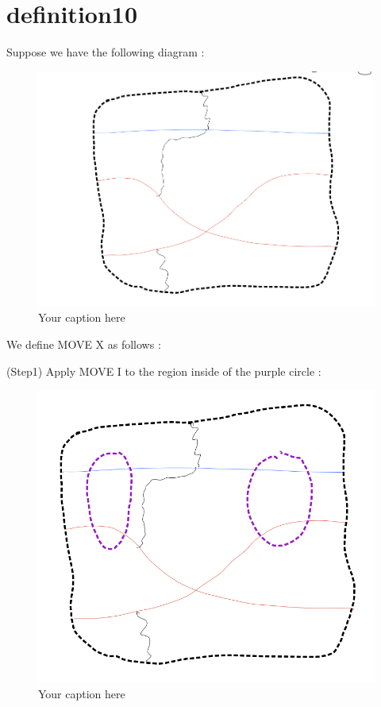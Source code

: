 \section{definition10}
\begin{definition}
\end{definition}


Suppose we have the following diagram :

\begin{figure}[H] %
    \centering
    \includegraphics[width=\linewidth]{diagrams/definition10/1.png} %
    \caption{Your caption here}
    \label{fig:your-label}
\end{figure}

We define MOVE \RN{10} as follows :

(Step1) Apply MOVE \RN{1} to the region inside of the purple circle :

\begin{figure}[H] %
    \centering
    \includegraphics[width=\linewidth]{diagrams/definition10/2.png} %
    \caption{Your caption here}
    \label{fig:your-label}
\end{figure}

